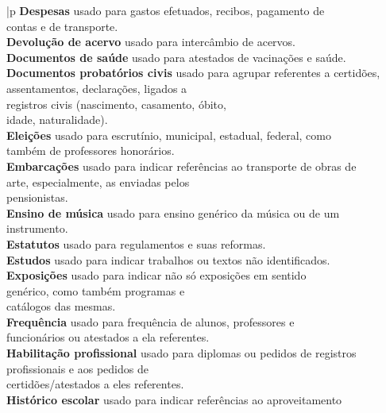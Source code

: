 \begin{tabbing}{|p}
	\textbf{Despesas} \>\>usado para \> gastos efetuados, recibos, pagamento de\\
	\>\> \> contas e de transporte.\\
	\textbf{Devolução de acervo} \>\>usado para \> intercâmbio de acervos.\\
	\textbf{Documentos de saúde} \>\>usado para \> atestados de vacinações e saúde.\\
	\textbf{Documentos probatórios civis} \>\>usado para \> agrupar referentes a certidões,\\
	\>\> \> assentamentos, declarações, ligados a\\
	\>\> \> registros civis (nascimento, casamento, óbito,\\
	\>\> \> idade, naturalidade).\\
	\textbf{Eleições} \>\>usado para \> escrutínio, municipal, estadual, federal, como\\
	\>\> \> também de professores honorários.\\
	\textbf{Embarcações} \>\>usado para \> indicar referências ao transporte de obras de\\
	\>\> \> arte, especialmente, as enviadas pelos\\
	\>\> \> pensionistas.\\
	\textbf{Ensino de música} \>\>usado para \> ensino genérico da música ou de um\\
	\>\> \> instrumento.\\
	\textbf{Estatutos} \>\>usado para \> regulamentos e suas reformas.\\
	\textbf{Estudos} \>\>usado para \> indicar trabalhos ou textos não identificados.\\
	\textbf{Exposições} \>\>usado para \> indicar não só exposições em sentido\\
	\>\> \> genérico, como também programas e\\
	\>\> \> catálogos das mesmas.\\
	\textbf{Frequência} \>\>usado para \> frequência de alunos, professores e\\
	\>\> \> funcionários ou atestados a ela referentes.\\
	\textbf{Habilitação profissional} \>\>usado para \> diplomas ou pedidos de registros\\
	\>\> \> profissionais e aos pedidos de\\
	\>\> \> certidões/atestados a eles referentes.\\
	\textbf{Histórico escolar} \>\>usado para \> indicar referências ao aproveitamento\\

\end{tabbing}
